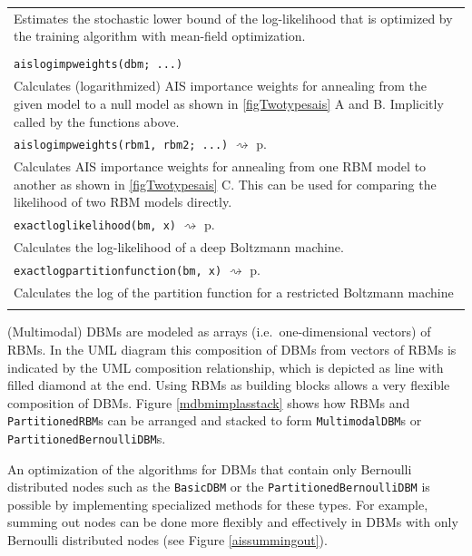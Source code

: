 \documentclass[12pt]{article}
\newcommand{\inlinecode}[1]{\texttt{#1}}
\newcommand{\rightpageref}[1]{\hfill $\rightsquigarrow$ p.\ \pageref{#1}}
\begin{document}
\begin{table}[h]
\begin{tabularx}{\textwidth}{X}
   Estimates the stochastic lower bound of the log-likelihood that is optimized by the training algorithm with mean-field optimization. \\
    \makecell[tl]{
    \inlinecode{aislogimpweights(rbm; ...)} \\
   \inlinecode{aislogimpweights(dbm; ...)}
   } \rightpageref{bms_aislogimpweights} \\
   Calculates (logarithmized) AIS importance weights for annealing from the given model to a null model as shown in \ref{figTwotypesais} A and B. Implicitly called by the functions above. \\
     \inlinecode{aislogimpweights(rbm1, rbm2; ...)}  \rightpageref{bms_aislogimpweights} \\
    Calculates AIS importance weights for annealing from one RBM model to another as shown in \ref{figTwotypesais} C.
    This can be used for comparing the likelihood of two RBM models directly.\\
       \inlinecode{exactloglikelihood(bm, x)} \rightpageref{bms_exactloglikelihood} \\
   Calculates the log-likelihood of a deep Boltzmann machine. \\
   \inlinecode{exactlogpartitionfunction(bm, x)} \rightpageref{bms_exactlogpartitionfunction} \\
   Calculates the log of the partition function for a restricted Boltzmann machine \\
 \Xhline{1pt}
\end{tabularx}
\end{table}


(Multimodal) DBMs are modeled as arrays (i.e.\ one-dimensional vectors) of RBMs.
In the UML diagram this composition of DBMs from vectors of RBMs is indicated by the UML composition relationship, which is depicted as line with filled diamond at the end.
Using RBMs as building blocks allows a very flexible composition of DBMs.
Figure \ref{mdbmimplasstack} shows how RBMs and \inlinecode{PartitionedRBM}s can be  arranged  and stacked to form \inlinecode{MultimodalDBM}s or \inlinecode{PartitionedBernoulliDBM}s.

An optimization of the algorithms for DBMs that contain only Bernoulli distributed nodes such as the \inlinecode{BasicDBM} or the \inlinecode{PartitionedBernoulliDBM} is possible by implementing specialized methods for these types.
For example, summing out nodes can be done more flexibly and effectively in DBMs with only Bernoulli distributed nodes (see Figure \ref{aissummingout}).
\end{document}
